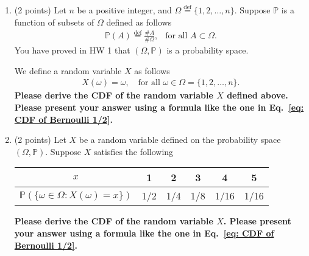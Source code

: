 \documentclass[11pt]{article}
\newcommand{\p}{\mathbb{P}}
\begin{document}
\begin{enumerate}
\begin{enumerate}
\begin{proof}
    Now, we can use this relation to show that $\mathbb{P}(A|B) + \mathbb{P}(A^c| B) = 1$.
    \begin{align*}
        \p(A\,|\,B) &= \frac{\p(A\cap B)}{\p(B)} & \text{(conditional probability)}\\
        &= \frac{\p(B)-\p(A^c\cap B)}{\p(B)} & \text{(substitute from above)}\\
        &= \frac{\p(B)}{\p(B)}-\frac{\p(A^c\cap B)}{\p(B)} & \text{(distributive prop.)}\\
        &= 1 - \p(A^c\,|\,B) & \text{(conditional probability)}
    \end{align*}
\end{proof}
\end{enumerate}


\item (2 points) Let $n$ be a positive integer, and $\Omega \overset{\operatorname{def}}{=}\{1,2,\ldots,n\}$. Suppose $\mathbb{P}$ is a function of subsets of $\Omega$ defined as follows
\begin{align*}
\mathbb{P}(A)\overset{\operatorname{def}}{=}\frac{\# A}{\#\Omega}, \ \ \text{ for all }A\subset \Omega.
\end{align*}
You have proved in HW 1 that $(\Omega,\mathbb{P})$ is a probability space. 

We define a random variable $X$ as follows
\begin{align*}
    X(\omega)=\omega,\ \ \ \text{ for all }\omega\in\Omega=\{1,2,\ldots,n\}.
\end{align*}
\textbf{Please derive the CDF of the random variable $X$ defined above. Please present your answer using a formula like the one in Eq.~\eqref{eq: CDF of Bernoulli 1/2}.}

\item (2 points) Let $X$ be a random variable defined on the probability space $(\Omega,\mathbb{P})$. Suppose $X$ satisfies the following
\begin{table}[h]
\centering
\begin{tabular}{c|ccccc} \hline
$x$ & 1 & 2 & 3 & 4 & 5 \\\hline
$\mathbb{P}(\{\omega\in\Omega: X(\omega)=x\})$ & 1/2 & 1/4 & 1/8 & 1/16 & 1/16 \\\hline
\end{tabular}
\end{table}

\textbf{Please derive the CDF of the random variable $X$. Please present your answer using a formula like the one in Eq.~\eqref{eq: CDF of Bernoulli 1/2}.}



\end{enumerate}
\end{document}
